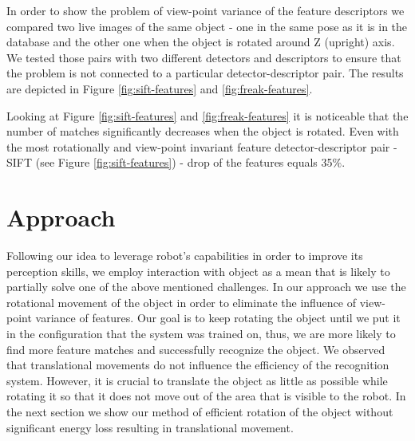 In order to show the problem of view-point variance of the feature descriptors we compared two live images of the same object - one in the same pose as it is in the database and the other one when the object is rotated around Z (upright) axis. We tested those pairs with two different detectors and descriptors to ensure that the problem is not connected to a particular detector-descriptor pair. The results are depicted in Figure \ref{fig:sift-features} and \ref{fig:freak-features}.%

Looking at Figure \ref{fig:sift-features} and \ref{fig:freak-features} it is noticeable that the number of matches significantly decreases when the object is rotated. Even with the most rotationally and view-point invariant feature detector-descriptor pair - SIFT (see Figure \ref{fig:sift-features}) - drop of the features equals 35$\%$.



\section{Approach}

Following our idea to leverage robot's capabilities in order to improve its perception skills, we employ interaction with object as a mean that is likely to partially solve one of the above mentioned challenges. In our approach we use the rotational movement of the object in order to eliminate the influence of view-point variance of features. Our goal is to keep rotating the object until we put it in the configuration that the system was trained on, thus, we are more likely to find more feature matches and successfully recognize the object. We observed that translational movements do not influence the efficiency of the recognition system. However, it is crucial to translate the object as little as possible while rotating it so that it does not move out of the area that is visible to the robot. In the next section we show our method of efficient rotation of the object without significant energy loss resulting in translational movement.

